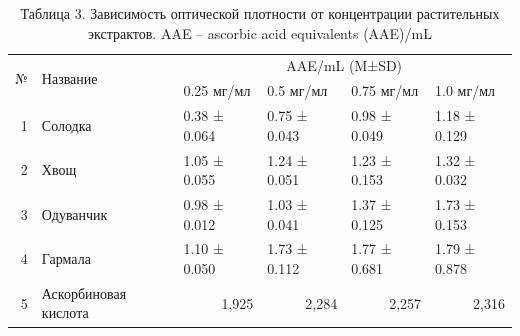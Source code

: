 \begin{table}[H]
\caption*{Таблица 3. Зависимость оптической плотности от концентрации
растительных экстрактов. AAE -- ascorbic acid equivalents (AAE)/mL}
\centering
\begin{tabular}{|r|l|llll|}
\hline
\multicolumn{1}{|l|}{\multirow{2}{*}{№}} &
  \multirow{2}{*}{Название} &
  \multicolumn{4}{c|}{AAE/mL (M±SD)} \\ \cline{3-6} 
\multicolumn{1}{|l|}{} &
   &
  \multicolumn{1}{l|}{0.25 мг/мл} &
  \multicolumn{1}{l|}{0.5 мг/мл} &
  \multicolumn{1}{l|}{0.75 мг/мл} &
  1.0 мг/мл \\ \hline
1 &
  Солодка &
  \multicolumn{1}{l|}{0.38 ± 0.064} &
  \multicolumn{1}{l|}{0.75 ± 0.043} &
  \multicolumn{1}{l|}{0.98 ± 0.049} &
  1.18 ± 0.129 \\ \hline
2 &
  Хвощ &
  \multicolumn{1}{l|}{1.05 ± 0.055} &
  \multicolumn{1}{l|}{1.24 ± 0.051} &
  \multicolumn{1}{l|}{1.23 ± 0.153} &
  1.32 ± 0.032 \\ \hline
3 &
  Одуванчик &
  \multicolumn{1}{l|}{0.98 ± 0.012} &
  \multicolumn{1}{l|}{1.03 ± 0.041} &
  \multicolumn{1}{l|}{1.37 ± 0.125} &
  1.73 ± 0.153 \\ \hline
4 &
  Гармала &
  \multicolumn{1}{l|}{1.10 ± 0.050} &
  \multicolumn{1}{l|}{1.73 ± 0.112} &
  \multicolumn{1}{l|}{1.77 ± 0.681} &
  1.79 ± 0.878 \\ \hline
5 &
  Аскорбиновая кислота &
  \multicolumn{1}{r|}{1,925} &
  \multicolumn{1}{r|}{2,284} &
  \multicolumn{1}{r|}{2,257} &
  \multicolumn{1}{r|}{2,316} \\ \hline
\end{tabular}
\end{table}

